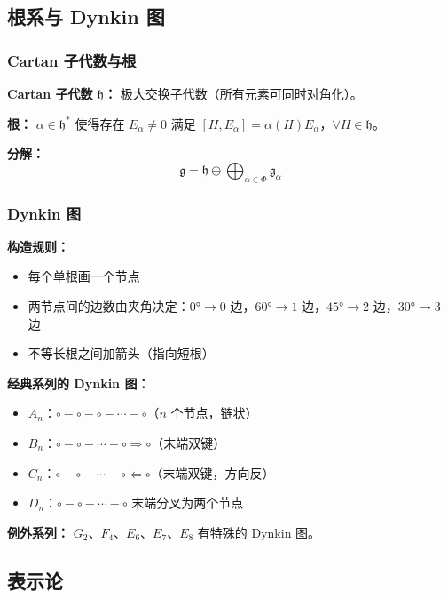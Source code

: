 \subsection{根系与 Dynkin 图}

\subsubsection{Cartan 子代数与根}

\textbf{Cartan 子代数 $\mathfrak{h}$：} 极大交换子代数（所有元素可同时对角化）。

\textbf{根：} $\alpha \in \mathfrak{h}^*$ 使得存在 $E_\alpha \neq 0$ 满足 $[H, E_\alpha] = \alpha(H)E_\alpha$，$\forall H \in \mathfrak{h}$。

\textbf{分解：}
\[
\mathfrak{g} = \mathfrak{h} \oplus \bigoplus_{\alpha \in \Phi} \mathfrak{g}_\alpha
\]

\subsubsection{Dynkin 图}

\textbf{构造规则：}
\begin{itemize}
  \item 每个单根画一个节点
  \item 两节点间的边数由夹角决定：$0° \to 0$ 边，$60° \to 1$ 边，$45° \to 2$ 边，$30° \to 3$ 边
  \item 不等长根之间加箭头（指向短根）
\end{itemize}

\textbf{经典系列的 Dynkin 图：}

\begin{itemize}
  \item $A_n$：$\circ - \circ - \circ - \cdots - \circ$（$n$ 个节点，链状）
  \item $B_n$：$\circ - \circ - \cdots - \circ \Rightarrow \circ$（末端双键）
  \item $C_n$：$\circ - \circ - \cdots - \circ \Leftarrow \circ$（末端双键，方向反）
  \item $D_n$：$\circ - \circ - \cdots - \circ$ 末端分叉为两个节点
\end{itemize}

\textbf{例外系列：} $G_2$、$F_4$、$E_6$、$E_7$、$E_8$ 有特殊的 Dynkin 图。

\subsection{表示论}

